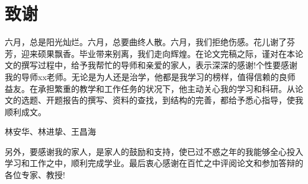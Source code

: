 
\chapter*{致谢}

{\fangsong 六月，总是阳光灿烂。六月，总要曲终人散。六月，我们拒绝伤感。花儿谢了芬芳，迎来硕果飘香。毕业带来别离，我们走向辉煌。在论文完稿之际，谨对在本论文的撰写过程中，给予我帮忙的导师和亲爱的家人，表示深深的感谢!个性要感谢我的导师xx老师。无论是为人还是治学，他都是我学习的榜样，值得信赖的良师益友。在承担繁重的教学和工作任务的状况下，他主动关心我的学习和科研。从论文的选题、开题报告的撰写、资料的查找，到结构的完善，都给予悉心指导，使我顺利成文。}

{\fangsong 林安华、林进挚、王昌海}

{\fangsong 另外，要感谢我的家人，是家人的鼓励和支持，使已过不惑之年的我能够全心投入学习和工作之中，顺利完成学业。最后衷心感谢在百忙之中评阅论文和参加答辩的各位专家、教授!}
